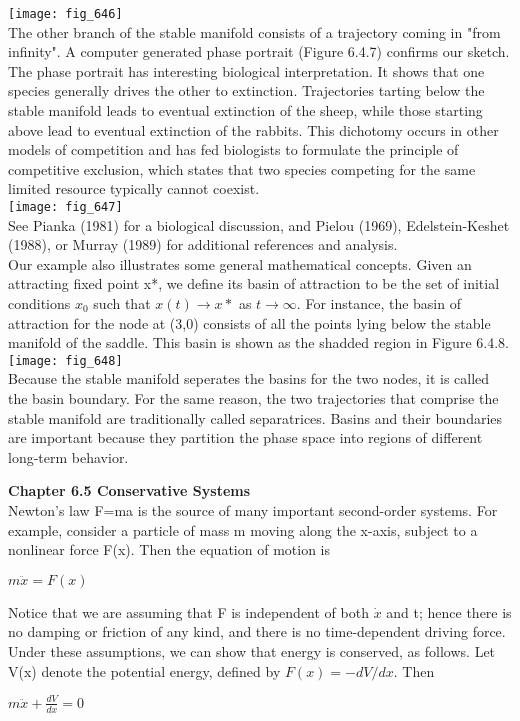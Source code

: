 \documentclass{article}
\newcommand\tab[1][1cm]{\hspace*{#1}}
\begin{document}
\texttt{[image: fig\_646]} \\
The other branch of the stable manifold consists of a trajectory coming in "from infinity". A computer generated phase portrait (Figure 6.4.7) confirms our sketch. The phase portrait has interesting biological interpretation. It shows that one species generally drives the other to extinction. Trajectories tarting below the stable manifold leads to eventual extinction of the sheep, while those starting above lead to eventual extinction of the rabbits. This dichotomy occurs in other models of competition and has fed biologists to formulate the principle of competitive exclusion, which states that two species competing for the same limited resource typically cannot coexist. \\ \texttt{[image: fig\_647]} \\ See Pianka (1981) for a biological discussion, and Pielou (1969), Edelstein-Keshet (1988), or Murray (1989) for additional references and analysis. \\ \tab
Our example also illustrates some general mathematical concepts. Given an attracting fixed point x*, we define its basin of attraction to be the set of initial conditions $x_{0}$ such that $x(t) \to x*$ as $t \to \infty$. For instance, the basin of attraction for the node at (3,0) consists of all the points lying below the stable manifold of the saddle. This basin is shown as the shadded region in Figure 6.4.8.
\\ \texttt{[image: fig\_648]}
\\ Because the stable manifold seperates the basins for the two nodes, it is called the basin boundary. For the same reason, the two trajectories that comprise the stable manifold are traditionally called separatrices. Basins and their boundaries are important because they partition the phase space into regions of different long-term behavior. 

\textbf {Chapter 6.5 Conservative Systems}
\\ Newton's law F=ma is the source of many important second-order systems. For example, consider a particle of mass m moving along the x-axis, subject to  a nonlinear force F(x). Then the equation of motion is
\begin{center}
$m\ddot{x}=F(x)$
\end{center}
Notice that we are assuming that F is independent of both $\dot{x}$ and t; hence there is no damping or friction of any kind, and there is no time-dependent driving force. \\ \tab
Under these assumptions, we can show that energy is conserved, as follows. Let V(x) denote the potential energy, defined by $F(x)=-dV/dx$. Then 
\begin{center}
$m\ddot{x}+\frac{dV}{dx}=0$
\end{center}
\end{document}
